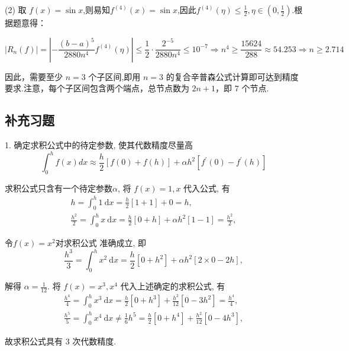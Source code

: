 \begin{tcolorbox}
(2) 取 $f(x)=\sin x$,则易知$f^{(4)}(x)=\sin x$,因此$f^{(4)}(\eta)\leqslant \frac 12,\eta \in(0,\frac 12)$.根据题意得：

$$ \left|R_n\left(f\right)\right|=\left|-\frac{(b-a)^{5}}{2880 n^{4}} f^{(4)}(\eta)\right| \leqslant \frac 12\cdot\frac{2^{-5}}{2880 n^{4}}  \leqslant  10^{-7} \Rightarrow n^4\geqslant \frac{15624}{288}\approx 54.253\Rightarrow n\geqslant 2.714$$


因此，需要至少 $n=3$ 个子区间,即用 $ n=3 $ 的复合辛普森公式计算即可达到精度要求.注意，每个子区间包含两个端点，总节点数为 $2n+1$，即 $7$ 个节点.

  \end{tcolorbox}

\subsection{补充习题}
  \begin{tcolorbox}[enhanced,colback=10,colframe=9,breakable,coltitle=green!25!black,title=2024]


1. 确定求积公式中的待定参数, 使其代数精度尽量高
$$
\int_{0}^{h} f(x) d x \approx \frac{h}{2}[f(0)+f(h)]+\alpha h^{2}\left[f^{\prime}(0)-f^{\prime}(h)\right]
$$

\tcblower
 求积公式只含有一个待定参数$\alpha$, 将 $ f(x)=1, x $ 代入公式, 有
$$
\begin{aligned}
h=\int_{0}^{h} 1 \mathrm{~d} x=\frac{h}{2}[1+1]+0=h, \\
\frac{h^{2}}{2}=\int_{0}^{h} x \mathrm{~d} x=\frac{h}{2}[0+h]+\alpha h^{2}[1-1]=\frac{h^{2}}{2},
\end{aligned}
$$

令$ f(x)=x^{2} $对求积公式 准确成立, 即
$$
\frac{h^{3}}{3}=\int_{0}^{h} x^{2} \mathrm{~d} x=\frac{h}{2}\left[0+h^{2}\right]+\alpha h^{2}[2 \times 0-2 h],
$$

解得 $ \alpha=\frac{1}{12} $.
将 $ f(x)=x^{3}, x^{4} $ 代入上述确定的求积公式, 有
$$
\begin{aligned}
\frac{h^{4}}{4}=\int_{0}^{h} x^{3} \mathrm{~d} x=\frac{h}{2}\left[0+h^{3}\right]+\frac{h^{2}}{12}\left[0-3 h^{2}\right]=\frac{h^{4}}{4}, \\
\frac{h^{5}}{5}=\int_{0}^{h} x^{4} \mathrm{~d} x \neq \frac{1}{6} h^{5}=\frac{h}{2}\left[0+h^{4}\right]+\frac{h^{2}}{12}\left[0-4 h^{3}\right],
\end{aligned}
$$

故求积公式具有 3 次代数精度.
  \end{tcolorbox}


